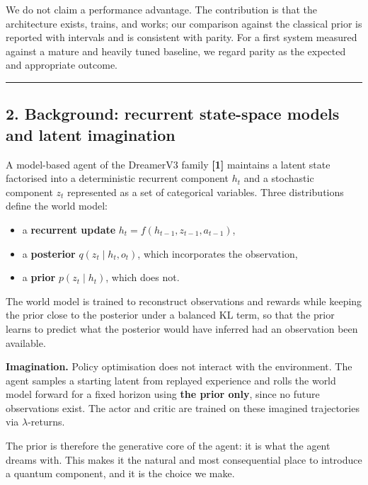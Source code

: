 \documentclass[
  11pt]{article}
\providecommand{\tightlist}{%
  \setlength{\itemsep}{0pt}\setlength{\parskip}{0pt}}
\begin{document}
We do not claim a performance advantage. The contribution is that the
architecture exists, trains, and works; our comparison against the
classical prior is reported with intervals and is consistent with
parity. For a first system measured against a mature and heavily tuned
baseline, we regard parity as the expected and appropriate outcome.

\begin{center}\rule{0.5\linewidth}{0.5pt}\end{center}

\hypertarget{background-recurrent-state-space-models-and-latent-imagination}{%
\subsection{2. Background: recurrent state-space models and latent
imagination}\label{background-recurrent-state-space-models-and-latent-imagination}}

A model-based agent of the DreamerV3 family \textbf{{[}1{]}} maintains a
latent state factorised into a deterministic recurrent component \(h_t\)
and a stochastic component \(z_t\) represented as a set of categorical
variables. Three distributions define the world model:

\begin{itemize}
\tightlist
\item
  a \textbf{recurrent update} \(h_t = f(h_{t-1}, z_{t-1}, a_{t-1})\),
\item
  a \textbf{posterior} \(q(z_t \mid h_t, o_t)\), which incorporates the
  observation,
\item
  a \textbf{prior} \(p(z_t \mid h_t)\), which does not.
\end{itemize}

The world model is trained to reconstruct observations and rewards while
keeping the prior close to the posterior under a balanced KL term, so
that the prior learns to predict what the posterior would have inferred
had an observation been available.

\textbf{Imagination.} Policy optimisation does not interact with the
environment. The agent samples a starting latent from replayed
experience and rolls the world model forward for a fixed horizon using
\textbf{the prior only}, since no future observations exist. The actor
and critic are trained on these imagined trajectories via
\(\lambda\)-returns.

The prior is therefore the generative core of the agent: it is what the
agent dreams with. This makes it the natural and most consequential
place to introduce a quantum component, and it is the choice we make.
\end{document}
